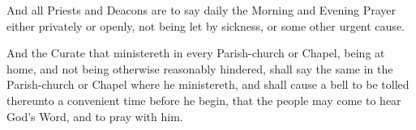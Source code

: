 And all Priests and Deacons are to say daily the Morning and Evening Prayer either privately or openly, not being let by sickness, or some other urgent cause.

And the Curate that ministereth in every Parish-church or Chapel, being at home, and not being otherwise reasonably hindered, shall say the same in the Parish-church or Chapel where he ministereth, and shall cause a bell to be tolled thereunto a convenient time before he begin, that the people may come to hear God's Word, and to pray with him.

\clearpage

